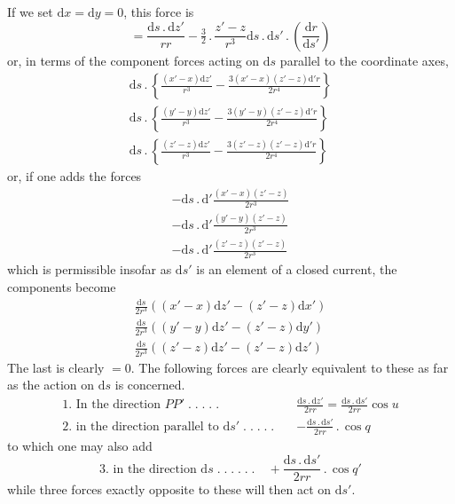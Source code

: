 If we set $\mathrm dx=\mathrm dy=0$, this force is
\[
=\frac{\mathrm ds\,.\,\mathrm dz'}{rr}-\tfrac{3}{2}\,.\,\frac{z'-z}{r^3}\mathrm ds\,.\,\mathrm ds'\,.\,\left(\frac{\mathrm dr}{\mathrm ds'}\right)
\]
or, in terms of the component forces acting on $\mathrm ds$ parallel to the coordinate axes,
\[
\begin{gathered}
\mathrm ds\,.\,\left\{\frac{(x'-x)\mathrm dz'}{r^3}-\frac{3(x'-x)(z'-z)\mathrm d'r}{2r^4}\right\}\\[4pt]
\mathrm ds\,.\,\left\{\frac{(y'-y)\mathrm dz'}{r^3}-\frac{3(y'-y)(z'-z)\mathrm d'r}{2r^4}\right\}\\[4pt]
\mathrm ds\,.\,\left\{\frac{(z'-z)\mathrm dz'}{r^3}-\frac{3(z'-z)(z'-z)\mathrm d'r}{2r^4}\right\}
\end{gathered}
\]
or, if one adds the forces
\[
\begin{gathered}
-\mathrm ds\,.\,\mathrm d'\frac{(x'-x)(z'-z)}{2r^3}\\[4pt]
-\mathrm ds\,.\,\mathrm d'\frac{(y'-y)(z'-z)}{2r^3}\\[4pt]
-\mathrm ds\,.\,\mathrm d'\frac{(z'-z)(z'-z)}{2r^3}
\end{gathered}
\]
which is permissible insofar as $\mathrm ds'$ is an element of a closed current, the components become
\[
\begin{gathered}
\frac{\mathrm ds}{2r^3}((x'-x)\mathrm dz'-(z'-z)\mathrm dx')\\[4pt]
\frac{\mathrm ds}{2r^3}((y'-y)\mathrm dz'-(z'-z)\mathrm dy')\\[4pt]
\frac{\mathrm ds}{2r^3}((z'-z)\mathrm dz'-(z'-z)\mathrm dz')
\end{gathered}
\]
The last is clearly $=0$. The following forces are clearly equivalent to these as far as the action on $\mathrm ds$ is concerned.
\[
\begin{aligned}
\text{1. In the direction }PP'\; .\;.\;.\;.\;.\quad&\frac{\mathrm ds\,.\,\mathrm dz'}{2rr}=\frac{\mathrm ds\,.\,\mathrm ds'}{2rr}\cos u\\[4pt]
\text{2. in the direction parallel to }\mathrm ds'\; .\;.\;.\;.\;.\quad&-\frac{\mathrm ds\,.\,\mathrm ds'}{2rr}\,.\,\cos q
\end{aligned}
\]
to which one may also add
\[
\text{3. in the direction }\mathrm ds\; .\;.\;.\;.\;.\;.\quad+\frac{\mathrm ds\,.\,\mathrm ds'}{2rr}\,.\,\cos q'
\]
while three forces exactly opposite to these will then act on $\mathrm ds'$.

